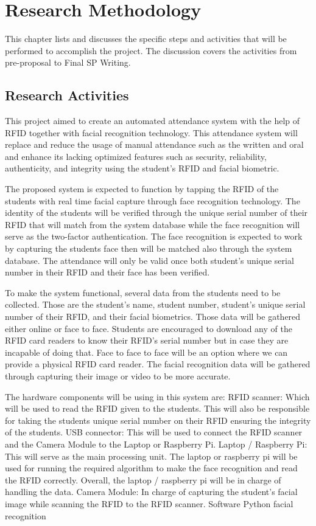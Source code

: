 \chapter{Research Methodology}
This chapter lists and discusses the specific steps and activities that will be performed  to accomplish the project. 
The discussion covers the activities from pre-proposal to Final SP Writing.

\section{Research Activities}
This project aimed to create an automated attendance system with the help of RFID together with facial recognition technology. This attendance system will replace and reduce the usage of manual attendance such as the written and oral and enhance its lacking optimized features such as security, reliability, authenticity, and integrity using the student’s RFID and facial biometric.

The proposed system is expected to function by tapping the RFID of the students with real time facial capture through face recognition technology. The identity of the students will be verified through the unique serial number of their RFID that will match from the system database while the face recognition will serve as the two-factor authentication. The face recognition is expected to work by capturing the students face then will be matched also through the system database. The attendance will only be valid once both student’s unique serial number in their RFID and their face has been verified.

To make the system functional, several data from the students need to be collected. Those are the student’s name, student number, student’s unique serial number of  their RFID, and their facial biometrics. Those data will be gathered either online or face to face. Students are encouraged to download any of the RFID card readers to know their RFID’s serial number but in case they are incapable of doing that. Face to face to face will be an option where we can provide a physical RFID card reader. The facial recognition data will be gathered through capturing their image or video to be more accurate. 

The hardware components will be using in this system are:
RFID scanner: Which will be used to read the RFID given to the students. This will also be responsible for taking the students unique serial number on their RFID ensuring the integrity of the students.
USB connector: This will be used to connect the RFID scanner and the Camera Module to the Laptop or Raspberry Pi.
Laptop / Raspberry Pi: This will serve as the main processing unit. The laptop or raspberry pi will be used for running the required algorithm to make the face recognition and read the RFID correctly. Overall, the laptop / raspberry pi will be in charge of handling the data.
Camera Module: In charge of capturing the student’s facial image while scanning the RFID to the RFID scanner. 
Software
Python facial recognition

